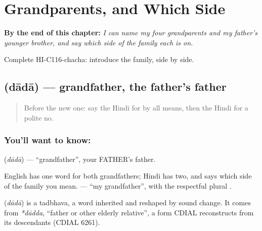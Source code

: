 
\chapter{Grandparents, and Which Side}
\label{ch:hi-grandparents}

\begin{chapteropening}
\textbf{By the end of this chapter:} \emph{I can name my four grandparents and my father's younger brother, and say which side of the family each is on.}

Complete HI-C116-chacha: introduce the family, side by side.
\end{chapteropening}

\section[\texorpdfstring{\hi{दादा} (dādā)}{दादा (dādā)}]{ (dādā) — grandfather, the father's father}

\label{lesson:HI-C116-dada}



\begin{quote}
Before the new one: say the Hindi for by all means, then the Hindi for a polite no.
\end{quote}

\subsection*{You'll want to know: }
\textbf{} (\emph{dādā}) — \textquotedblleft{}grandfather\textquotedblright{}, your FATHER's father.

English has one word for both grandfathers; Hindi has two, and says which side of the family you mean. \textbf{ } — \textquotedblleft{}my grandfather\textquotedblright{}, with the respectful plural \textbf{}.

\begin{cousinweb}
\textbf{} (\emph{dādā}) is a tadbhava, a word inherited and reshaped by sound change. It comes from \emph{*dādda}, \textquotedblleft{}father or other elderly relative\textquotedblright{}, a form CDIAL reconstructs from its descendants (CDIAL 6261).
\end{cousinweb}

